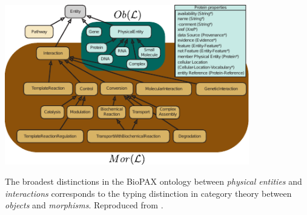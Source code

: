 \begin{frame}
\centering\includegraphics[width=0.8\textwidth]{fig/biopaxschemacat.pdf}
\begin{block}{}
The broadest distinctions in the BioPAX ontology between {\it physical entities} and {\it interactions} corresponds to the typing distinction in category theory between {\it objects} and {\it morphisms}. Reproduced from \cite{Demir2010}.
\end{block}
\end{frame}